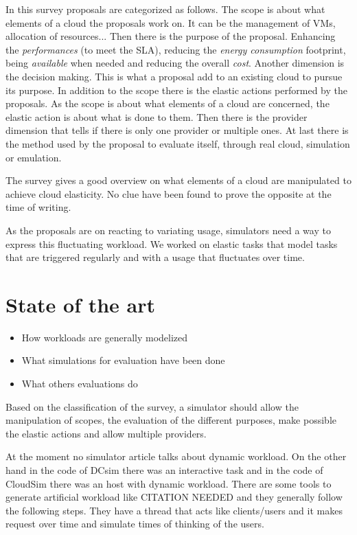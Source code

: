 \documentclass[a4paper]{IEEEtran}
\begin{document}
  In this survey proposals are categorized as follows. The scope is about what
  elements of a cloud the proposals work on. It can be the management of VMs,
  allocation of resources... Then there is the purpose of the proposal.
  Enhancing the \textit{performances} (to meet the SLA), reducing the
  \textit{energy consumption} footprint, being \textit{available} when needed
  and reducing the overall \textit{cost}. Another dimension is the decision
  making. This is what a proposal add to an existing cloud to pursue its
  purpose. In addition to the scope there is the elastic actions performed by
  the proposals. As the scope is about what elements of a cloud are concerned,
  the elastic action is about what is done to them. Then there is the provider
  dimension that tells if there is only one provider or multiple ones. At last
  there is the method used by the proposal to evaluate itself, through real
  cloud, simulation or emulation.
  
  The survey gives a good overview on what elements of a cloud are
  manipulated to achieve cloud elasticity. No clue have been found to prove the 
  opposite at the time of writing.
  
  As the proposals are on reacting to variating usage, simulators need a way to
  express this fluctuating workload. We worked on elastic tasks that model tasks
  that are triggered regularly and with a usage that fluctuates over time.


\section{State of the art} \label{sota}
  \begin{itemize}
    \item How workloads are generally modelized
    \item What simulations for evaluation have been done
    \item What others evaluations do
  \end{itemize}
  
  Based on the classification of the survey, a simulator should allow the
  manipulation of scopes, the evaluation of the different purposes, make
  possible the elastic actions and allow multiple providers.
  
  At the moment no simulator article talks about dynamic workload. On the other
  hand in the code of DCsim \cite{tighe2013towards} there was an interactive
  task and in the code of CloudSim \cite{calheiros2011cloudsim} there was an
  host with dynamic workload. There are some tools to generate artificial 
  workload like CITATION NEEDED and they generally follow the following steps. 
  They have a thread that acts like clients/users and it makes request over 
  time and simulate times of thinking of the users.
\end{document}
